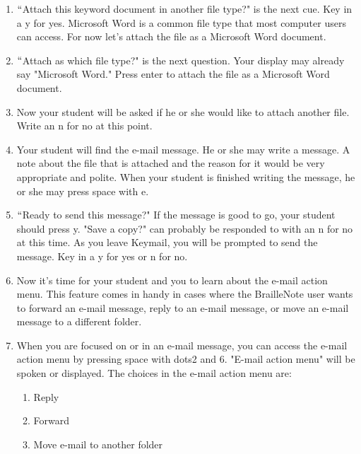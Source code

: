 \documentclass[10pt,letterpaper,twoside]{report}
\begin{document}
{{{{\begin{enumerate}
	\item $``$Attach this keyword document in another file type?" is the next cue. Key in a y for yes.  Microsoft Word is a common file type that most computer users can access.  For now let's attach the file as a Microsoft Word document.
	      
	\item $``$Attach as which file type?" is the next question.  Your display may already say "Microsoft Word." Press enter to attach the file as a Microsoft Word document.
	      
	\item Now your student will be asked if he or she would like to attach another file.  Write an n for no at this point.
	      
	\item Your student will find the e-mail message.  He or she may write a message.  A note about the file that is attached and the reason for it would be very appropriate and polite.  When your student is finished writing the message, he or she may press space with e.
	      
	\item $``$Ready to send this message?" If the message is good to go, your student should press y.  "Save a copy?" can probably be responded to with an n for no at this time.  As you leave Keymail, you will be prompted to send the message.  Key in a y for yes or n for no.
	      
	\item Now it's time for your student and you to learn about the e-mail action menu.  This feature comes in handy in cases where the BrailleNote user wants to forward an e-mail message, reply to an e-mail message, or move an e-mail message to a different folder.
	      
	\item When you are focused on or in an e-mail message, you can access the e-mail action menu by pressing space with dots2 and 6.  "E-mail action menu" will be spoken or displayed.  The choices in the e-mail action menu are:
	      
	      \begin{enumerate}
		      \item Reply
		            
		      \item Forward
		            
		      \item Move e-mail to another folder
		            

\end{enumerate}
\end{enumerate}}}}}
\end{document}
